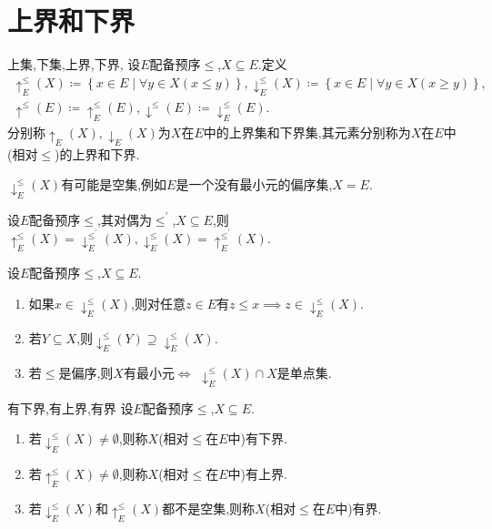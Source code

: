 \section{上界和下界}

\begin{definition}{上集,下集,上界,下界,}{}
	设$E$配备预序$\leq$,$X\subseteq E$.定义
	\begin{gather*}
		\uparrow_{E}^{\leq}\left(X\right)\coloneq\left\{x\in E\middle|\forall y\in X\left(x\leq y\right)\right\},\downarrow_{E}^{\leq}\left(X\right)\coloneq\left\{x\in E\middle|\forall y\in X\left(x\geq y\right)\right\},\\
		\uparrow^{\leq}\left(E\right)\coloneq\uparrow_{E}^{\leq}\left(E\right),\downarrow^{\leq}\left(E\right)\coloneq\downarrow_{E}^{\leq}\left(E\right).
	\end{gather*}
	分别称$\uparrow_{E}\left(X\right),\downarrow_{E}\left(X\right)$为$X$在$E$中的上界集和下界集,其元素分别称为$X$在$E$中(相对$\leq$)的上界和下界.
\end{definition}

\begin{remark}{}{}
	$\downarrow_{E}^{\leq}\left(X\right)$有可能是空集,例如$E$是一个没有最小元的偏序集,$X=E$.
\end{remark}

\begin{proposition}{}{}
	设$E$配备预序$\leq$,其对偶为$\leq^{\prime}$,$X\subseteq E$,则$\uparrow_{E}^{\leq}\left(X\right)=\downarrow_{E}^{\leq^{\prime}}\left(X\right),\downarrow_{E}^{\leq}\left(X\right)=\uparrow_{E}^{\leq^{\prime}}\left(X\right)$.
\end{proposition}

\begin{proposition}{}{}
	设$E$配备预序$\leq$,$X\subseteq E$.
	\begin{enumerate}
		\item 如果$x\in\downarrow_{E}^{\leq}\left(X\right)$,则对任意$z\in E$有$z\leq x\implies z\in\downarrow_{E}^{\leq}\left(X\right)$.
		\item 若$Y\subseteq X$,则$\downarrow_{E}^{\leq}\left(Y\right)\supseteq\downarrow_{E}^{\leq}\left(X\right)$.
		\item 若$\leq$是偏序,则$X$有最小元$\iff$ $\downarrow_{E}^{\leq}\left(X\right)\cap X$是单点集.
	\end{enumerate}
\end{proposition}

\begin{definition}{有下界,有上界,有界}{}
	设$E$配备预序$\leq$,$X\subseteq E$.
	\begin{enumerate}
		\item 若$\downarrow_{E}^{\leq}\left(X\right)\neq\emptyset$,则称$X$(相对$\leq$在$E$中)有下界.
		\item 若$\uparrow_{E}^{\leq}\left(X\right)\neq\emptyset$,则称$X$(相对$\leq$在$E$中)有上界.
		\item 若$\downarrow_{E}^{\leq}\left(X\right)$和$\uparrow_{E}^{\leq}\left(X\right)$都不是空集,则称$X$(相对$\leq$在$E$中)有界.
	\end{enumerate}
\end{definition}

